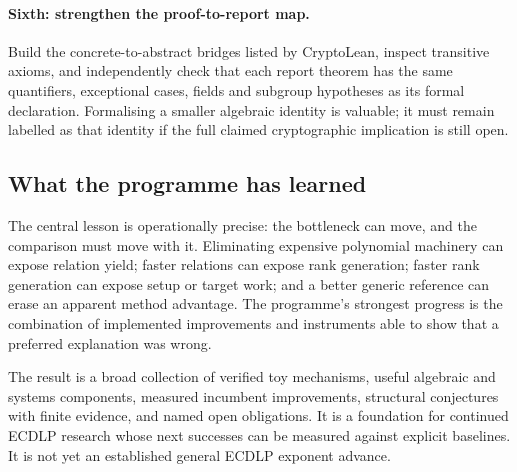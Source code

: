\paragraph{Sixth: strengthen the proof-to-report map.}
Build the concrete-to-abstract bridges listed by CryptoLean, inspect
transitive axioms, and independently check that each report theorem has
the same quantifiers, exceptional cases, fields and subgroup hypotheses
as its formal declaration. Formalising a smaller algebraic identity is
valuable; it must remain labelled as that identity if the full claimed
cryptographic implication is still open.

\subsection{What the programme has learned}

The central lesson is operationally precise: the bottleneck can move,
and the comparison must move with it. Eliminating expensive polynomial
machinery can expose relation yield; faster relations can expose rank
generation; faster rank generation can expose setup or target work;
and a better generic reference can erase an apparent method advantage.
The programme's strongest progress is the combination of implemented
improvements and instruments able to show that a preferred explanation
was wrong.

The result is a broad collection of verified toy mechanisms, useful
algebraic and systems components, measured incumbent improvements,
structural conjectures with finite evidence, and named open obligations.
It is a foundation for continued ECDLP research whose next successes
can be measured against explicit baselines. It is not yet an
established general ECDLP exponent advance.
